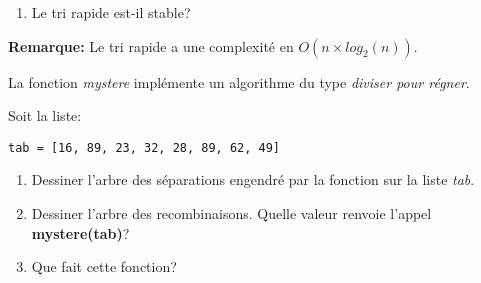 \documentclass[a4paper,11pt]{article}
\begin{document}
\begin{Form}
\begin{exo}
\begin{enumerate}
\item Le tri rapide est-il stable?
\end{enumerate}
\textbf{Remarque:} Le tri rapide a une complexité en $O(n×log_2(n))$.
\end{exo}
\begin{exo}
La fonction \emph{mystere} implémente un algorithme du type \emph{diviser pour régner}.

Soit la liste:
\begin{lstlisting}
tab = [16, 89, 23, 32, 28, 89, 62, 49]
\end{lstlisting}
\begin{enumerate}
\item Dessiner l'arbre des séparations engendré par la fonction sur la liste \emph{tab}.
\item Dessiner l'arbre des recombinaisons. Quelle valeur renvoie l'appel \textbf{mystere(tab)}?
\item Que fait cette fonction?
\end{enumerate}
\end{exo}
\end{Form}
\end{document}
